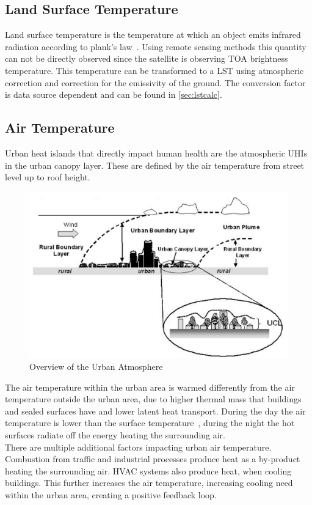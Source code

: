 \documentclass[12pt,a4paper, english,twoside]{scrartcl}
\begin{document}
  \subsection{Land Surface Temperature}\label{ssec:lst}
    Land surface temperature is the temperature at which an object emits infrared radiation according to plank's law~\autocite{Liang2020}.
    Using remote sensing methods this quantity can not be directly observed since the satellite is observing \gls{TOA} brightness temperature.
    This temperature can be transformed to a \gls{LST} using atmospheric correction and correction for the emissivity of the ground.
    The conversion factor is data source dependent and can be found in \cref{sec:lstcalc}.
  \subsection{Air Temperature}\label{ssec:airtemperature}
    Urban heat islands that directly impact human health are the atmospheric \glspl{UHI} in the urban canopy layer. 
    These are defined by the air temperature from street level up to roof height. 
    \begin{figure}[htbp]
       \begin{center}
         \includegraphics[width=\textwidth]{img/CanopyLayer.png}
       \end{center}
       \caption{Overview of the Urban Atmosphere \autocite[Figure 1]{Fabrizi2010}\label{fig:canopeylayer}}
     \end{figure}
    The air temperature within the urban area is warmed differently from the air temperature outside the urban area, due to higher thermal mass that buildings and sealed surfaces have and lower latent heat transport.
    During the day the air temperature is lower than the surface temperature~\autocite{EPA2008}, during the night the hot surfaces radiate off the energy heating the surrounding air.\\
    There are multiple additional factors impacting urban air temperature. 
    Combustion from traffic and industrial processes produce heat as a by-product heating the surrounding air. 
    HVAC systems also produce heat, when cooling buildings. 
    This further increases the air temperature, increasing cooling need within the urban area, creating a positive feedback loop. 
    
\end{document}
